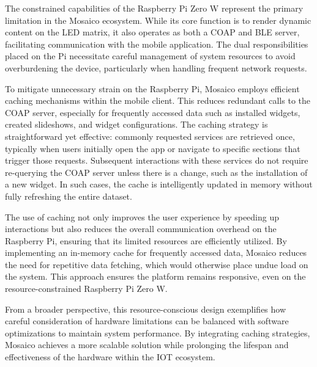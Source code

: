 The constrained capabilities of the Raspberry Pi Zero W represent the primary limitation in the Mosaico ecosystem. While its core function is to render dynamic content on the LED matrix, it also operates as both a COAP and BLE server, facilitating communication with the mobile application. The dual responsibilities placed on the Pi necessitate careful management of system resources to avoid overburdening the device, particularly when handling frequent network requests.

To mitigate unnecessary strain on the Raspberry Pi, Mosaico employs efficient caching mechanisms within the mobile client. This reduces redundant calls to the COAP server, especially for frequently accessed data such as installed widgets, created slideshows, and widget configurations. The caching strategy is straightforward yet effective: commonly requested services are retrieved once, typically when users initially open the app or navigate to specific sections that trigger those requests. Subsequent interactions with these services do not require re-querying the COAP server unless there is a change, such as the installation of a new widget. In such cases, the cache is intelligently updated in memory without fully refreshing the entire dataset.

The use of caching not only improves the user experience by speeding up interactions but also reduces the overall communication overhead on the Raspberry Pi, ensuring that its limited resources are efficiently utilized. By implementing an in-memory cache for frequently accessed data, Mosaico reduces the need for repetitive data fetching, which would otherwise place undue load on the system. This approach ensures the platform remains responsive, even on the resource-constrained Raspberry Pi Zero W.

From a broader perspective, this resource-conscious design exemplifies how careful consideration of hardware limitations can be balanced with software optimizations to maintain system performance. By integrating caching strategies, Mosaico achieves a more scalable solution while prolonging the lifespan and effectiveness of the hardware within the IOT ecosystem.